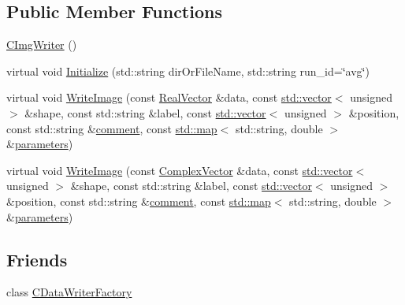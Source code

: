 \subsection*{Public Member Functions}
\begin{DoxyCompactItemize}
\item 
\hyperlink{class_q_s_t_e_m_1_1_c_img_writer_acbb51c8912d7439fe798ef6a52171e05}{C\-Img\-Writer} ()
\item 
virtual void \hyperlink{class_q_s_t_e_m_1_1_c_img_writer_a778d66cc62e4bc2f3390e459b93ad555}{Initialize} (std\-::string dir\-Or\-File\-Name, std\-::string run\-\_\-id=\char`\"{}avg\char`\"{})
\item 
virtual void \hyperlink{class_q_s_t_e_m_1_1_c_img_writer_a628956c70f52c70b9246be6117db5d7e}{Write\-Image} (const \hyperlink{namespace_q_s_t_e_m_a8dfe9e1dbecce3838cb082d96e991ba7}{Real\-Vector} \&data, const \hyperlink{qmb_8m_af54b69a32590de218622e869b06b47b3}{std\-::vector}$<$ unsigned $>$ \&shape, const std\-::string \&label, const \hyperlink{qmb_8m_af54b69a32590de218622e869b06b47b3}{std\-::vector}$<$ unsigned $>$ \&position, const std\-::string \&\hyperlink{image_sim_8m_aea4cc4bd8e43a7f8ebf9b0ee3da8d681}{comment}, const \hyperlink{_displacement_params_8m_af619c74fd72bdb64d115463dff2720cd}{std\-::map}$<$ std\-::string, double $>$ \&\hyperlink{sim_image_from_wave_8m_acb6d7970e73c00effe1d16e23142f11d}{parameters})
\item 
virtual void \hyperlink{class_q_s_t_e_m_1_1_c_img_writer_ac1cbc5988f5a7b071d867835552c5db9}{Write\-Image} (const \hyperlink{namespace_q_s_t_e_m_af210a2c1f9afae1deed746dcd9276221}{Complex\-Vector} \&data, const \hyperlink{qmb_8m_af54b69a32590de218622e869b06b47b3}{std\-::vector}$<$ unsigned $>$ \&shape, const std\-::string \&label, const \hyperlink{qmb_8m_af54b69a32590de218622e869b06b47b3}{std\-::vector}$<$ unsigned $>$ \&position, const std\-::string \&\hyperlink{image_sim_8m_aea4cc4bd8e43a7f8ebf9b0ee3da8d681}{comment}, const \hyperlink{_displacement_params_8m_af619c74fd72bdb64d115463dff2720cd}{std\-::map}$<$ std\-::string, double $>$ \&\hyperlink{sim_image_from_wave_8m_acb6d7970e73c00effe1d16e23142f11d}{parameters})
\end{DoxyCompactItemize}
\subsection*{Friends}
\begin{DoxyCompactItemize}
\item 
class \hyperlink{class_q_s_t_e_m_1_1_c_img_writer_ae101e33302a9953fd5b55df2273d5a0c}{C\-Data\-Writer\-Factory}
\end{DoxyCompactItemize}
